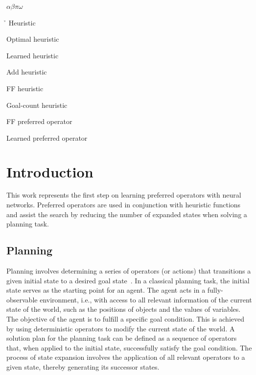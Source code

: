 \documentclass[ppgc,diss,english]{iiufrgs}
\begin{document}
\begin{listofsymbols}{$\alpha\beta\pi\omega$}
       \item[\h] Heuristic
       \item[\hstar] Optimal heuristic
       \item[\hnn] Learned heuristic
       \item[\hadd] Add heuristic
       \item[\hff] FF heuristic
       \item[\hgc] Goal-count heuristic
       \item[\poff] FF preferred operator
       \item[\pog] Learned preferred operator
\end{listofsymbols}

\listoffigures

\listoftables

\listofalgorithms

\tableofcontents

%
%
\chapter{Introduction}

This work represents the first step on learning preferred operators with neural networks. Preferred operators are used in conjunction with heuristic functions and assist the search by reducing the number of expanded states when solving a planning task.

\section{Planning}
Planning involves determining a series of operators (or actions) that transitions a given initial state to a desired goal state~\cite{Lipovetsky/2014}.
In a classical planning task, the initial state serves as the starting point for an agent. The agent acts in a fully-observable environment, i.e., with access to all relevant information of the current state of the world, such as the positions of objects and the values of variables. The objective of the agent is to fulfill a specific goal condition. This is achieved by using deterministic operators to modify the current state of the world. A solution plan for the planning task can be defined as a sequence of operators that, when applied to the initial state, successfully satisfy the goal condition. The process of state expansion involves the application of all relevant operators to a given state, thereby generating its successor states.
\end{document}
